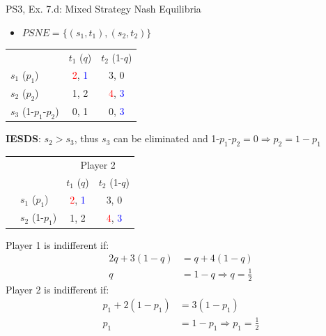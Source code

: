 \begin{frame}{PS3, Ex. 7.d: Mixed Strategy Nash Equilibria}
  \begin{multicols}{2}
    \begin{itemize}
      \item[(d)] $PSNE=\{(s_1,t_1),(s_2,t_2)\}$
    \end{itemize}
    \vspace{-8pt}
    \begin{table}
      \begin{tabular}{l|c|c|}
          \multicolumn{1}{c}{}  & \multicolumn{1}{c}{$t_1$ ($q$)} & \multicolumn{1}{c}{$t_2$ (1-$q$)} \\\cline{2-3}
          $s_1$ ($p_1$)         & \textcolor{red}{2}, \textcolor{blue}{1} & 3, 0 \\\cline{2-3}
          $s_2$ ($p_2$)         & 1, 2 & \textcolor{red}{4}, \textcolor{blue}{3} \\\cline{2-3}
          $s_3$ (1-$p_1$-$p_2$) & 0, 1 & 0, \textcolor{blue}{3} \\\cline{2-3}
      \end{tabular}
    \end{table}
    \vspace{-2pt}
    \textbf{IESDS}: $s_2>s_3$, thus $s_3$ can be eliminated and 1-$p_1$-$p_2=0\Rightarrow p_2=1-p_1$
    \vspace{-6pt}
    \begin{table}
      \begin{tabular}{cl|c|c|}
        & \multicolumn{1}{c}{} & \multicolumn{2}{c}{\color{blue}Player 2}\\
        \parbox[t]{1mm}{}
        &   &  &  \\
        & $s_1$ ($p_1$)  & \textcolor{red}{2}, \textcolor{blue}{1} & 3, 0 \\
        & $s_2$ (1-$p_1$)& 1, 2 & \textcolor{red}{4}, \textcolor{blue}{3} \\
      \end{tabular}
    \end{table}
    Player 1 is indifferent if:
    \begin{align*}
      2q+3(1-q) &= q+4(1-q) \\
      q &= 1-q \Rightarrow q = \frac{1}{2}
    \end{align*}
    Player 2 is indifferent if:
    \begin{align*}
      p_1 + 2(1-p_1)  &= 3(1-p_1) \\
      p_1             &= 1-p_1 \Rightarrow p_1 = \frac{1}{2}
    \end{align*}
  \vfill\null \columnbreak
  \vfill\null
  \end{multicols}
\end{frame}

